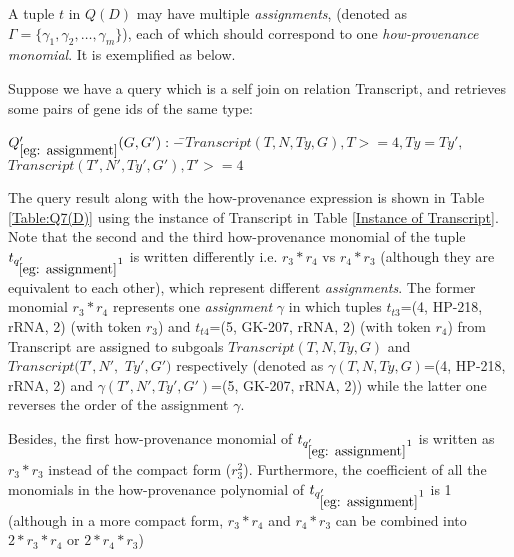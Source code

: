 
 
A tuple $t$ in $Q(D)$ may have multiple {\em assignments}, (denoted as $\Gamma = \{\gamma_1, \gamma_2, \dots, \gamma_m\}$), each of which should correspond to one {\em how-provenance monomial}. It is exemplified as below.


\begin{example} \label{eg: assignment}
Suppose we have a query which is a self join on relation Transcript, and retrieves some pairs of gene ids of the same type:
\begin{tabbing}
$Q_{\ref{eg: assignment}}'(G, G') :- $\=$Transcript(T, N, Ty, G), T >= 4, Ty = Ty',$\\
\>$Transcript(T', N', Ty', G'), T' >= 4$
\end{tabbing}

The query result along with the how-provenance expression is shown in Table \ref{Table:Q7(D)} using the instance of Transcript in Table \ref{Instance of Transcript}. Note that the second and the third how-provenance monomial of the tuple $t_{q_{\ref{eg: assignment}}'1}$ is written differently i.e. $r_3*r_4$ vs $r_4*r_3$ (although they are equivalent to each other), which represent different {\em assignments}. The former monomial $r_3*r_4$ represents one {\em assignment} $\gamma$ in which tuples $t_{t3}$=(4, HP-218, rRNA, 2) (with token $r_3$) and $t_{t4}$=(5, GK-207, rRNA, 2) (with token $r_4$) from Transcript are assigned to subgoals $Transcript(T, N, Ty, G)$ and $Transcript(T', N',$ $ Ty', G')$ respectively (denoted as $\gamma(T, N, Ty, G)$=(4, HP-218, rRNA, 2) and $\gamma(T', N', Ty', G')$=(5, GK-207, rRNA, 2)) while the latter one reverses the order of the assignment $\gamma$. 

Besides, the first how-provenance monomial of $t_{q_{\ref{eg: assignment}}'1}$ is written as $r_3*r_3$ instead of the compact form ($r_3^2$).  Furthermore, the coefficient of all the monomials in the how-provenance polynomial of $t_{q_{\ref{eg: assignment}}'1}$ is 1 (although in a more compact form, $r_3*r_4$ and $r_4*r_3$ can be combined into $2*r_3*r_4$ or $2*r_4*r_3$)



\end{example}
